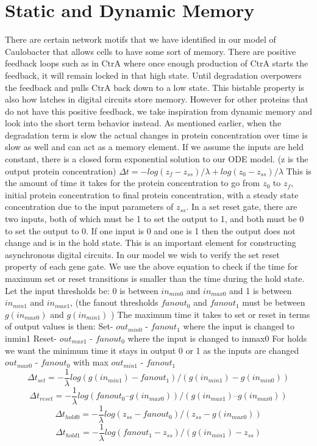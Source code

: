 \documentclass{article}
\begin{document}
\section{Static and Dynamic Memory}
There are certain network motifs that we have identified in our model of Caulobacter that allows cells to have some sort of memory.  There are positive feedback loops such as in CtrA where once enough production of CtrA starts the feedback, it will remain locked in that high state.  Until degradation overpowers the feedback and pulls CtrA back down to a low state.  This bistable property is also how latches in digital circuits store memory.  However for other proteins that do not have this positive feedback, we take inspiration from dynamic memory and look into the short term behavior instead.  As mentioned earlier, when the degradation term is slow the actual changes in protein concentration over time is slow as well and can act as a memory element.  If we assume the inputs are held constant, there is a closed form exponential solution to our ODE model.  (z is the output protein concentration)
$\Delta t= -log(z_f-z_{ss})/ \lambda+ log(z_0-z_{ss})/ \lambda$ This is the amount of time it takes for the protein concentration to go from $z_0$ to $z_f$, initial protein concentration to final protein concentration, with a steady state concentration due to the input parameters of $z_{ss}$.
\newline
In a set reset gate, there are two inputs, both of which must be 1 to set the output to 1, and both must be 0 to set the output to 0.  If one input is 0 and one is 1 then the output does not change and is in the hold state.  This is an important element for constructing asynchronous digital circuits.  
In our model we wish to verify the set reset property of each gene gate.  We use the above equation to check if the time for maximum set or reset transitions is smaller than the time during the hold state.  
Let the input thresholds be:  0 is between $in_{min0}$ and $in_{max0}$ and 1 is between $in_{min1}$ and $in_{max1}$, (the fanout thresholds $fanout_0$ and $fanout_1$ must be between $g(in_{max0})$ and $g(in_{min1})$ )
The maximum time it takes to set or reset in terms of output values is then: \newline
Set- $out_{min0}$ - $fanout_1$ where the input is changed to inmin1 \newline
Reset- $out_{max1}$ - $fanout_0$ where the input is changed to inmax0 \newline
For holds we want the minimum time it stays in output 0 or 1 as the inputs are changed \newline
$out_{max0}$ - $fanout_0$ with max \newline
$out_{min1}$ - $fanout_1$ \newline
\[\Delta t_{set}= - \frac{1}{\lambda} log(g(in_{min1})-fanout_1)/(g(in_{min1}) -g(in_{min0}))
\]
\[\Delta t_{reset}= -\frac{1}{\lambda} log(fanout_0 –g(in_{max0}))/(g(in_{max1}) – g(in_{max0}))
\]
\[\Delta t_{hold0}= -\frac{1}{\lambda} log(z_{ss} -fanout_0)/(z_{ss} -g(in_{max0}))				
\]
\[\Delta t_{hold1}= -\frac{1}{\lambda} log(fanout_1 -z_{ss})/(g(in_{min1}) -z_{ss})
\]
\end{document}
